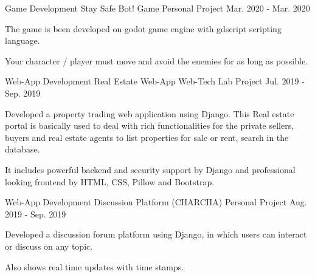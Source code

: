 

\begin{cventries}

  \cventry
    {Game Development} %
    {Stay Safe Bot! Game} %
    {Personal Project} %
    {Mar. 2020 - Mar. 2020} %
    {
      \begin{cvitems} %
        \item {The game is been developed on godot game engine with gdscript scripting language.}
        \item {Your character / player must move and avoid the enemies for as long as possible.}
      \end{cvitems}
    }

  \cventry
    {Web-App Development} %
    {Real Estate Web-App} %
    {Web-Tech Lab Project} %
    {Jul. 2019 - Sep. 2019} %
    {
      \begin{cvitems} %
        \item {Developed a property trading web application using Django. This Real estate portal is basically used to deal with rich functionalities for the private sellers, buyers and real estate agents to list properties for sale or rent, search in the database.}
        \item {It includes powerful backend and security support by Django and professional looking frontend by HTML, CSS, Pillow and Bootstrap.}
      \end{cvitems}
    }

  \cventry
    {Web-App Development} %
    {Discussion Platform (CHARCHA)} %
    {Personal Project} %
    {Aug. 2019 - Sep. 2019} %
    {
      \begin{cvitems} %
        \item {Developed a discussion forum platform using Django, in which users can interact or discuss on any topic.}
        \item {Also shows real time updates with time stamps.}
      \end{cvitems}
    }


\end{cventries}
